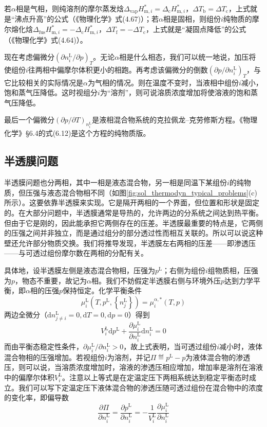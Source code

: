 \documentclass[main.tex]{subfiles}
\begin{document}
若$\alpha$相是气相，则纯溶剂的摩尔蒸发焓$\Delta_\text{vap}H_{\text{m},i}^*=\Delta_\text{c}H_{\text{m},i}^*$，$\Delta T_\text{b}=\Delta T_\text{c}$，上式就是“沸点升高”的公式（《物理化学》式(4.67)）；若$\alpha$相是固相，则组份$i$纯物质的摩尔熔化焓$\Delta_\text{fus}H_{\text{m},i}^*=-\Delta_\text{c}H_{\text{m},i}^*$，$\Delta T_\text{f}=-\Delta T_\text{c}$，上式就是“凝固点降低”的公式（《物理化学》式(4.64)）。

现在考虑偏微分$\left(\partial n_i^\text{L}/\partial p\right)_T$。无论$\alpha$相是什么相态，我们可以统一地说，加压将使组份$i$往两相中偏摩尔体积更小的相跑。再考虑该偏微分的倒数$\left(\partial p/\partial n_i^\text{L}\right)_T$，与它比较相关的实际情况是$\alpha$为气相的情况。则在温度不变时，当液相中组份$i$减小，饱和蒸气压降低。这时视组分$i$为“溶剂”，则可说溶质浓度增加将使溶液的饱和蒸气压降低。

最后一个偏微分$\left(\partial p/\partial T\right)_{n_i^\text{L}}$是液相混合物系统的克拉佩龙--克劳修斯方程。《物理化学》\S6.4的式(6.12)是这个方程的纯物质版。

\subsection{半透膜问题}\label{sec:II.5.4_semipermeable_membrane}
半透膜问题也分两相，其中一相是液态混合物，另一相是同温下某组份$i$的纯物质，但压强与液态混合物相不同（如图\ref{fig:sol_thermodyn_typical_problems}(c)所示）。这要依靠半透膜来实现。它是隔开两相的一个界面，但位置和形状是固定的。在大部分问题中，半透膜通常是导热的，允许两边的分系统之间达到热平衡。但由于它是刚的，因此能承担它两侧存在的压差。半透膜最重要的特点是，它两侧的压强之间并非独立，而是通过组分的部分透过性而相互关联的。所以可以说这种壁还允许部分物质交换。我们将推导发现，半透膜左右两相的压差——即渗透压——与可透过组份摩尔数在两相的分配有关。

具体地，设半透膜左侧是液态混合物相，压强为$p^\text{L}$；右侧为组份$i$组物质相，压强为$p$，物态不重要，故记为$\alpha$相。我们不妨假定半透膜右侧与环境外压$p$达到力学平衡，即$\alpha$相的压强$p$保持恒定。化学平衡条件
\begin{equation}\label{eq:II.5_osmotic_equilibrium}
  \mu_i^\text{L}\left(T,p^\text{L},\left\{n_j^\text{L}\right\}\right)=\mu_i^{\alpha,*}\left(T,p\right)
\end{equation}
两边全微分（$\mathrm{d}n_{j\neq i}^\text{L}=0,\mathrm{d}T=0,\mathrm{d}p=0$）得到
\[V_i^\text{L}\mathrm{d}p^\text{L}+\frac{\partial \mu_i^\text{L}}{\partial n_i^\text{L}}\mathrm{d}n_i^\text{L}=0\]
而由平衡态稳定性条件，$\partial\mu_i^\text{L}/\partial n_i^\text{L}>0$，故上式表明，当可透过组份$i$减小时，液体混合物相的压强增加。若视组份$i$为溶剂，并记$\Pi\eqdef p^\text{L}-p$为液体混合物的渗透压，则可以说，当溶质浓度增加时，溶液的渗透压相应增加，增加率是溶剂在溶液中的偏摩尔体积$V_i^\text{L}$。注意以上等式是在定温定压下两相系统达到稳定平衡态时成立。我们可以写下定温定压下液体混合物的渗透压随可透过组份在混合物中的浓度的变化率，即偏导数
\begin{equation}\label{eq:II.5_osmotic_pressure_partial_derivative}
  \frac{\partial\Pi}{\partial n_i^\text{L}}=\frac{\partial p^\text{L}}{\partial n_i^\text{L}}=-\frac{1}{V_i^\text{L}}\frac{\partial\mu_i^\text{L}}{\partial n_i^\text{L}}
\end{equation}
\end{document}
